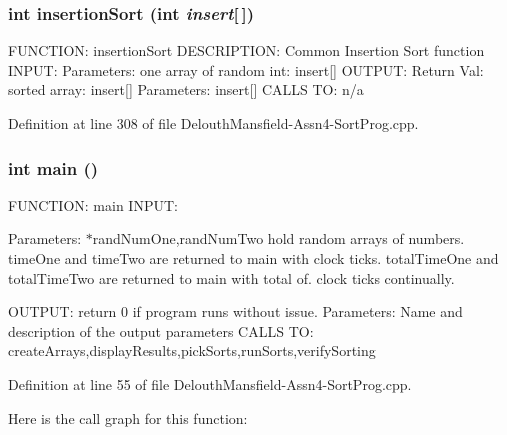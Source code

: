 \hypertarget{_delouth_mansfield-_assn4-_sort_prog_8cpp_abdd451b9bf57eb321b817db4405d65fd}{
\subsubsection[{insertionSort}]{\setlength{\rightskip}{0pt plus 5cm}int insertionSort (int {\em insert}\mbox{[}$\,$\mbox{]})}}
\label{_delouth_mansfield-_assn4-_sort_prog_8cpp_abdd451b9bf57eb321b817db4405d65fd}
FUNCTION: insertionSort DESCRIPTION: Common Insertion Sort function INPUT: Parameters: one array of random int: insert\mbox{[}\mbox{]} OUTPUT: Return Val: sorted array: insert\mbox{[}\mbox{]} Parameters: insert\mbox{[}\mbox{]} CALLS TO: n/a 

Definition at line 308 of file DelouthMansfield-\/Assn4-\/SortProg.cpp.

\hypertarget{_delouth_mansfield-_assn4-_sort_prog_8cpp_ae66f6b31b5ad750f1fe042a706a4e3d4}{
\subsubsection[{main}]{\setlength{\rightskip}{0pt plus 5cm}int main ()}}
\label{_delouth_mansfield-_assn4-_sort_prog_8cpp_ae66f6b31b5ad750f1fe042a706a4e3d4}
FUNCTION: main INPUT:

Parameters: $\ast$randNumOne,randNumTwo hold random arrays of numbers. timeOne and timeTwo are returned to main with clock ticks. totalTimeOne and totalTimeTwo are returned to main with total of. clock ticks continually.

OUTPUT: return 0 if program runs without issue. Parameters: Name and description of the output parameters CALLS TO: createArrays,displayResults,pickSorts,runSorts,verifySorting 

Definition at line 55 of file DelouthMansfield-\/Assn4-\/SortProg.cpp.



Here is the call graph for this function:

